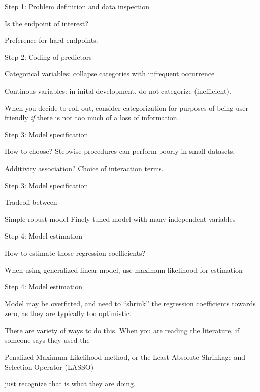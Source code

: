 \documentclass[10pt,ignorenonframetext,]{beamer}
\begin{document}
\begin{frame}{Step 1: Problem definition and data inspection}

Is the endpoint of interest?

Preference for hard endpoints.

\end{frame}

\begin{frame}{Step 2: Coding of predictors}

Categorical variables: collapse categories with infrequent occurrence

Continous variables: in inital development, do not categorize
(inefficient).

When you decide to roll-out, consider categorization for purposes of
being user friendly \emph{if} there is not too much of a loss of
information.

\end{frame}

\begin{frame}{Step 3: Model specification}

How to choose? Stepwise procedures can perform poorly in small datasets.

Additivity association? Choice of interaction terms.

\end{frame}

\begin{frame}{Step 3: Model specification}

Tradeoff between

Simple robust model Finely-tuned model with many independent variables

\end{frame}

\begin{frame}{Step 4: Model estimation}

How to estimate those regression coefficients?

When using generalized linear model, use maximum likelihood for
estimation

\end{frame}

\begin{frame}{Step 4: Model estimation}

Model may be overfitted, and need to ``shrink'' the regression
coefficients towards zero, as they are typically too optimistic.

There are variety of ways to do this. When you are reading the
literature, if someone says they used the

Penalized Maximum Likelihood method, or the Least Absolute Shrinkage and
Selection Operator (LASSO)

just recognize that is what they are doing.

\end{frame}
\end{document}

